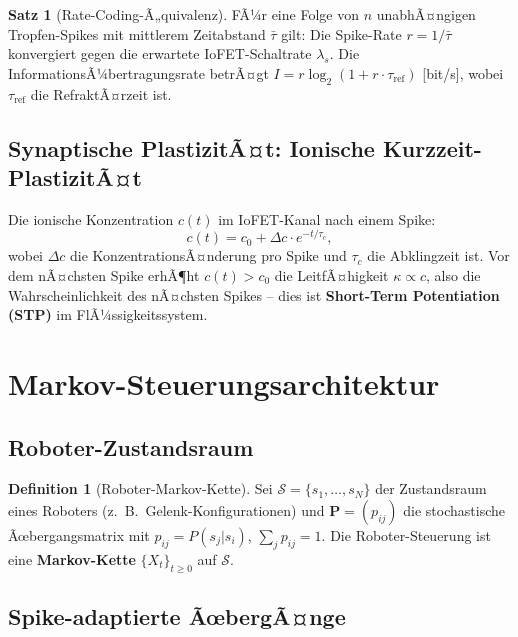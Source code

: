 ﻿\documentclass[a4paper,12pt]{scrreprt}
\theoremstyle{definition}
\newtheorem{definition}{Definition}[section]
\newtheorem{satz}{Satz}[section]
\newcommand{\matr}[1]{\mathbf{#1}}
\begin{document}
\begin{satz}[Rate-Coding-Ã„quivalenz]
  FÃ¼r eine Folge von $n$ unabhÃ¤ngigen Tropfen-Spikes mit mittlerem
  Zeitabstand $\bar\tau$ gilt: Die Spike-Rate $r = 1/\bar\tau$
  konvergiert gegen die erwartete IoFET-Schaltrate $\lambda_s$.
  Die InformationsÃ¼bertragungsrate betrÃ¤gt
  $I = r \log_2(1 + r \cdot \tau_{\mathrm{ref}})$ [bit/s],
  wobei $\tau_{\mathrm{ref}}$ die RefraktÃ¤rzeit ist.
\end{satz}

\subsection{Synaptische PlastizitÃ¤t: Ionische Kurzzeit-PlastizitÃ¤t}

Die ionische Konzentration $c(t)$ im IoFET-Kanal nach einem Spike:
\[
  c(t) = c_0 + \Delta c \cdot e^{-t/\tau_c},
\]
wobei $\Delta c$ die KonzentrationsÃ¤nderung pro Spike und $\tau_c$
die Abklingzeit ist. Vor dem nÃ¤chsten Spike erhÃ¶ht $c(t) > c_0$ die
LeitfÃ¤higkeit $\kappa \propto c$, also die Wahrscheinlichkeit des
nÃ¤chsten Spikes -- dies ist \textbf{Short-Term Potentiation (STP)}
im FlÃ¼ssigkeitssystem.

\section{Markov-Steuerungsarchitektur}

\subsection{Roboter-Zustandsraum}

\begin{definition}[Roboter-Markov-Kette]
  Sei $\mathcal{S} = \{s_1,\ldots,s_N\}$ der Zustandsraum eines
  Roboters (z.\ B.\ Gelenk-Konfigurationen) und
  $\matr{P} = (p_{ij})$ die stochastische Ãœbergangsmatrix mit
  $p_{ij} = P(s_{j}|s_i)$, $\sum_j p_{ij} = 1$. Die Roboter-Steuerung
  ist eine \textbf{Markov-Kette} $\{X_t\}_{t\geq 0}$ auf $\mathcal{S}$.
\end{definition}

\subsection{Spike-adaptierte ÃœbergÃ¤nge}
\end{document}
